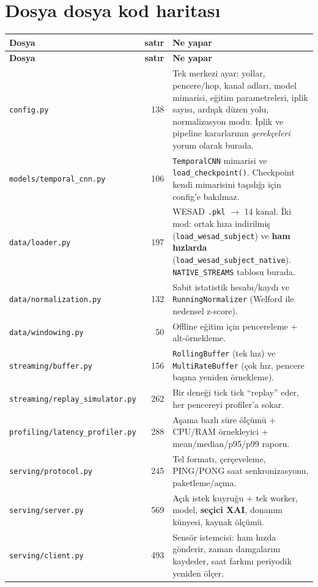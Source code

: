 \documentclass[11pt,a4paper]{report}
\newcommand{\kod}[1]{\texttt{\small #1}}
\newcommand{\dosya}[1]{\texttt{\footnotesize #1}}
\begin{document}
\section{Dosya dosya kod haritası}

\begin{longtable}{@{}p{4.6cm}rp{9.3cm}@{}}
\toprule
\textbf{Dosya} & \textbf{satır} & \textbf{Ne yapar} \\
\midrule
\endfirsthead
\toprule
\textbf{Dosya} & \textbf{satır} & \textbf{Ne yapar} \\
\midrule
\endhead
\dosya{config.py} & 138 & Tek merkezi ayar: yollar, pencere/hop, kanal adları, model mimarisi, eğitim parametreleri, iplik sayısı, ardışık düzen yolu, normalizasyon modu. İplik ve pipeline kararlarının \emph{gerekçeleri} yorum olarak burada. \\
\dosya{models/temporal\_cnn.py} & 106 & \kod{TemporalCNN} mimarisi ve \kod{load\_checkpoint()}. Checkpoint kendi mimarisini taşıdığı için config'e bakılmaz. \\
\dosya{data/loader.py} & 197 & WESAD \kod{.pkl} $\rightarrow$ 14 kanal. İki mod: ortak hıza indirilmiş (\kod{load\_wesad\_subject}) ve \textbf{ham hızlarda} (\kod{load\_wesad\_subject\_native}). \kod{NATIVE\_STREAMS} tablosu burada. \\
\dosya{data/normalization.py} & 132 & Sabit istatistik hesabı/kaydı ve \kod{RunningNormalizer} (Welford ile nedensel z-score). \\
\dosya{data/windowing.py} & 50 & Offline eğitim için pencereleme + alt-örnekleme. \\
\dosya{streaming/buffer.py} & 156 & \kod{RollingBuffer} (tek hız) ve \kod{MultiRateBuffer} (çok hız, pencere başına yeniden örnekleme). \\
\dosya{streaming/replay\_simulator.py} & 262 & Bir deneği tick tick ``replay'' eder, her pencereyi profiler'a sokar. \\
\dosya{profiling/latency\_profiler.py} & 288 & Aşama bazlı süre ölçümü + CPU/RAM örnekleyici + mean/median/p95/p99 raporu. \\
\dosya{serving/protocol.py} & 245 & Tel formatı, çerçeveleme, PING/PONG saat senkronizasyonu, paketleme/açma. \\
\dosya{serving/server.py} & 569 & Açık istek kuyruğu + tek worker, model, \textbf{seçici XAI}, donanım künyesi, kaynak ölçümü. \\
\dosya{serving/client.py} & 493 & Sensör istemcisi: ham hızda gönderir, zaman damgalarını kaydeder, saat farkını periyodik yeniden ölçer. \\

\end{longtable}
\end{document}
